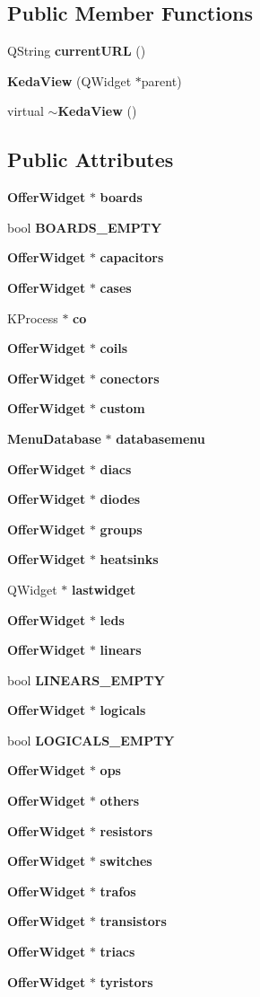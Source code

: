 \subsection*{Public Member Functions}
\begin{CompactItemize}
\item 
QString {\bf current\-URL} ()
\item 
{\bf Keda\-View} (QWidget $\ast$parent)
\item 
virtual {\bf $\sim$Keda\-View} ()
\end{CompactItemize}
\subsection*{Public Attributes}
\begin{CompactItemize}
\item 
{\bf Offer\-Widget} $\ast$ {\bf boards}
\item 
bool {\bf BOARDS\_\-EMPTY}
\item 
{\bf Offer\-Widget} $\ast$ {\bf capacitors}
\item 
{\bf Offer\-Widget} $\ast$ {\bf cases}
\item 
KProcess $\ast$ {\bf co}
\item 
{\bf Offer\-Widget} $\ast$ {\bf coils}
\item 
{\bf Offer\-Widget} $\ast$ {\bf conectors}
\item 
{\bf Offer\-Widget} $\ast$ {\bf custom}
\item 
{\bf Menu\-Database} $\ast$ {\bf databasemenu}
\item 
{\bf Offer\-Widget} $\ast$ {\bf diacs}
\item 
{\bf Offer\-Widget} $\ast$ {\bf diodes}
\item 
{\bf Offer\-Widget} $\ast$ {\bf groups}
\item 
{\bf Offer\-Widget} $\ast$ {\bf heatsinks}
\item 
QWidget $\ast$ {\bf lastwidget}
\item 
{\bf Offer\-Widget} $\ast$ {\bf leds}
\item 
{\bf Offer\-Widget} $\ast$ {\bf linears}
\item 
bool {\bf LINEARS\_\-EMPTY}
\item 
{\bf Offer\-Widget} $\ast$ {\bf logicals}
\item 
bool {\bf LOGICALS\_\-EMPTY}
\item 
{\bf Offer\-Widget} $\ast$ {\bf ops}
\item 
{\bf Offer\-Widget} $\ast$ {\bf others}
\item 
{\bf Offer\-Widget} $\ast$ {\bf resistors}
\item 
{\bf Offer\-Widget} $\ast$ {\bf switches}
\item 
{\bf Offer\-Widget} $\ast$ {\bf trafos}
\item 
{\bf Offer\-Widget} $\ast$ {\bf transistors}
\item 
{\bf Offer\-Widget} $\ast$ {\bf triacs}
\item 
{\bf Offer\-Widget} $\ast$ {\bf tyristors}
\end{CompactItemize}
